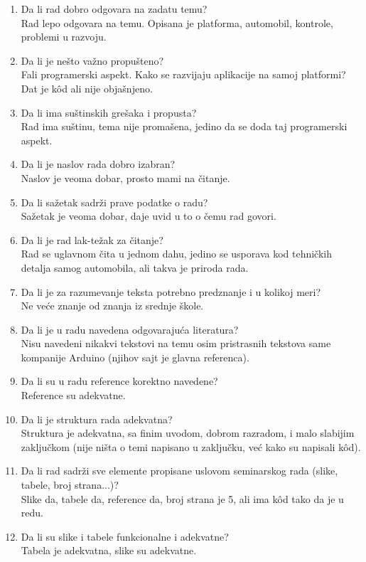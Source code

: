 \documentclass[a4paper]{article}
\begin{document}
	\begin{enumerate}
		\item Da li rad dobro odgovara na zadatu temu?\\ Rad lepo odgovara na temu. Opisana je platforma, automobil, kontrole, problemi u razvoju.
		\item Da li je nešto važno propušteno?\\ Fali programerski aspekt. Kako se razvijaju aplikacije na samoj platformi? Dat je k\^ od ali nije objašnjeno.
		\item Da li ima suštinskih grešaka i propusta?\\Rad ima suštinu, tema nije promašena, jedino da se doda taj programerski aspekt.
		\item Da li je naslov rada dobro izabran?\\ Naslov je veoma dobar, prosto mami na čitanje.
		\item Da li sažetak sadrži prave podatke o radu?\\ Sažetak je veoma dobar, daje uvid u to o čemu rad govori.
		\item Da li je rad lak-težak za čitanje?\\ Rad se uglavnom čita u jednom dahu, jedino se usporava kod tehničkih detalja samog automobila, ali takva je priroda rada.
		\item Da li je za razumevanje teksta potrebno predznanje i u kolikoj meri?\\ Ne veće znanje od znanja iz srednje škole.
		\item Da li je u radu navedena odgovarajuća literatura?\\ Nisu navedeni nikakvi tekstovi na temu osim pristrasnih tekstova same kompanije Arduino (njihov sajt je glavna referenca).
		\item Da li su u radu reference korektno navedene?\\ Reference su adekvatne.
		\item Da li je struktura rada adekvatna?\\ Struktura je adekvatna, sa finim uvodom, dobrom razradom, i malo slabijim zaključkom (nije ništa o temi napisano u zaključku, već kako su napisali k\^ od).
		\item Da li rad sadrži sve elemente propisane uslovom seminarskog rada (slike, tabele, broj strana...)?\\ Slike da, tabele da, reference da, broj strana je 5, ali ima k\^ od tako da je u redu.
		\item Da li su slike i tabele funkcionalne i adekvatne?\\ Tabela je adekvatna, slike su adekvatne.
	\end{enumerate}
	
\end{document}

